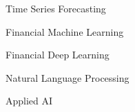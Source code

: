 \resumeSubheading
{Time Series Forecasting}
{}{}{}

\resumeSubheading
{Financial Machine Learning}
{}{}{}

\resumeSubheading
{Financial Deep Learning}
{}{}{}

\resumeSubheading
{Natural Language Processing}
{}{}{}

\resumeSubheading
{Applied AI}
{}{}{}


%
%
%
%
%
%
